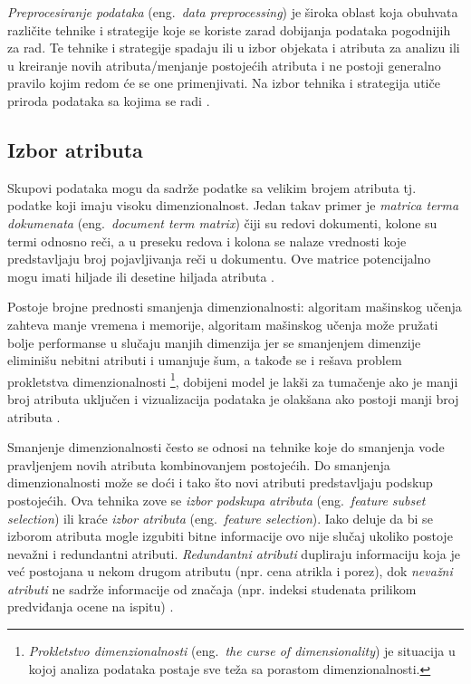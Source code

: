 \documentclass[12pt,oneside]{memoir}
\begin{document}
\textit{Preprocesiranje podataka} (eng.~\textit{data preprocessing}) je široka oblast koja obuhvata različite tehnike i strategije koje se koriste zarad dobijanja podataka pogodnijih za rad. Te tehnike i strategije spadaju ili u izbor objekata i atributa za analizu ili u kreiranje novih atributa/menjanje postojećih atributa i ne postoji generalno pravilo kojim redom će se one primenjivati. Na izbor tehnika i strategija utiče priroda podataka sa kojima se radi \cite{mitic}. 

\subsection{Izbor atributa}

Skupovi podataka mogu da sadrže podatke sa velikim brojem atributa tj. podatke koji imaju visoku dimenzionalnost. Jedan takav primer je \textit{matrica terma dokumenata} (eng.~\textit{document term matrix}) čiji su redovi dokumenti, kolone su termi odnosno reči, a u preseku redova i kolona se nalaze vrednosti koje predstavljaju broj pojavljivanja reči u dokumentu. Ove matrice potencijalno mogu imati hiljade ili desetine hiljada atributa \cite{mitic}. 

Postoje brojne prednosti smanjenja dimenzionalnosti: algoritam mašinskog učenja zahteva manje vremena i memorije, algoritam mašinskog učenja može pružati bolje performanse u slučaju manjih dimenzija jer se smanjenjem dimenzije eliminišu nebitni atributi i umanjuje šum, a takođe se i rešava problem prokletstva dimenzionalnosti \footnote{\textit{Prokletstvo dimenzionalnosti} (eng.~\textit{the curse of dimensionality}) je situacija u kojoj analiza podataka postaje sve teža sa porastom dimenzionalnosti.}, dobijeni model je lakši za tumačenje ako je manji broj atributa uključen i vizualizacija podataka je olakšana ako postoji manji broj atributa \cite{mitic, UMLFTA}.

Smanjenje dimenzionalnosti često se odnosi na tehnike koje do smanjenja vode pravljenjem novih atributa kombinovanjem postojećih. Do smanjenja dimenzionalnosti može se doći i tako što novi atributi predstavljaju podskup postojećih. Ova tehnika zove se \textit{izbor podskupa atributa} (eng.~\textit{feature subset selection}) ili kraće \textit{izbor atributa} (eng.~\textit{feature selection}). Iako deluje da bi se izborom atributa mogle izgubiti bitne informacije ovo nije slučaj ukoliko postoje nevažni i redundantni atributi. \textit{Redundantni atributi} dupliraju informaciju koja je već postojana u nekom drugom atributu (npr. cena atrikla i porez), dok \textit{nevažni atributi} ne sadrže informacije od značaja (npr. indeksi studenata prilikom predviđanja ocene na ispitu) \cite{mitic}. 
\end{document}
